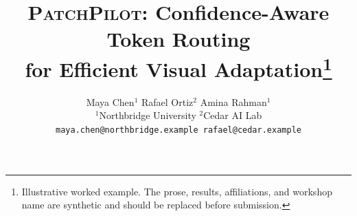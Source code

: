 \ifofficialcvpr\else
  \titleformat{\section}{\large\bfseries\color{ink}}{\thesection}{0.55em}{}
  \titleformat{\subsection}{\normalsize\bfseries\color{ink}}{\thesubsection}{0.5em}{}
  \setlength{\columnsep}{0.24in}
  \pagestyle{plain}
\fi

\setlength{\tabcolsep}{4pt}
\setlength{\bibsep}{1pt plus 0.3pt}
\renewcommand{\bibfont}{\footnotesize}

\newcommand{\method}{\textsc{PatchPilot}}
\newcommand{\workshop}{CVPR Workshop on Efficient and Adaptive Vision}
\newcommand{\R}{\mathbb{R}}
\newcommand{\E}{\mathbb{E}}
\newcommand{\1}{\mathbb{1}}
\DeclareMathOperator*{\argmax}{arg\,max}

\title{\method: Confidence-Aware Token Routing\\
for Efficient Visual Adaptation\thanks{Illustrative worked example.  The prose,
results, affiliations, and workshop name are synthetic and should be replaced
before submission.}}

\author{
Maya Chen$^{1}$ \quad Rafael Ortiz$^{2}$ \quad Amina Rahman$^{1}$\\
$^{1}$Northbridge University \qquad $^{2}$Cedar AI Lab\\
{\tt\small maya.chen@northbridge.example \quad rafael@cedar.example}
}
\date{}
